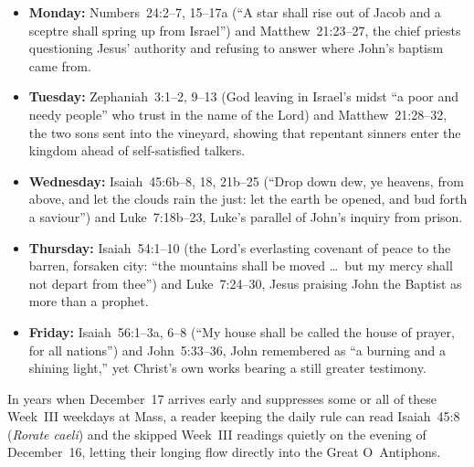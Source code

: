 \begin{itemize}
  \item \textbf{Monday:} Numbers~24:2--7, 15--17a (``A star shall rise out of Jacob and a sceptre shall spring up from Israel'') and Matthew~21:23--27, the chief priests questioning Jesus' authority and refusing to answer where John's baptism came from.
  \item \textbf{Tuesday:} Zephaniah~3:1--2, 9--13 (God leaving in Israel's midst ``a poor and needy people'' who trust in the name of the Lord) and Matthew~21:28--32, the two sons sent into the vineyard, showing that repentant sinners enter the kingdom ahead of self-satisfied talkers.
  \item \textbf{Wednesday:} Isaiah~45:6b--8, 18, 21b--25 (``Drop down dew, ye heavens, from above, and let the clouds rain the just: let the earth be opened, and bud forth a saviour'') and Luke~7:18b--23, Luke's parallel of John's inquiry from prison.
  \item \textbf{Thursday:} Isaiah~54:1--10 (the Lord's everlasting covenant of peace to the barren, forsaken city: ``the mountains shall be moved \dots\ but my mercy shall not depart from thee'') and Luke~7:24--30, Jesus praising John the Baptist as more than a prophet.
  \item \textbf{Friday:} Isaiah~56:1--3a, 6--8 (``My house shall be called the house of prayer, for all nations'') and John~5:33--36, John remembered as ``a burning and a shining light,'' yet Christ's own works bearing a still greater testimony.
\end{itemize}

In years when December~17 arrives early and suppresses some or all of these Week~III weekdays at Mass, a reader keeping the daily rule can read Isaiah~45:8 (\textit{Rorate caeli}) and the skipped Week~III readings quietly on the evening of December~16, letting their longing flow directly into the Great O~Antiphons.
